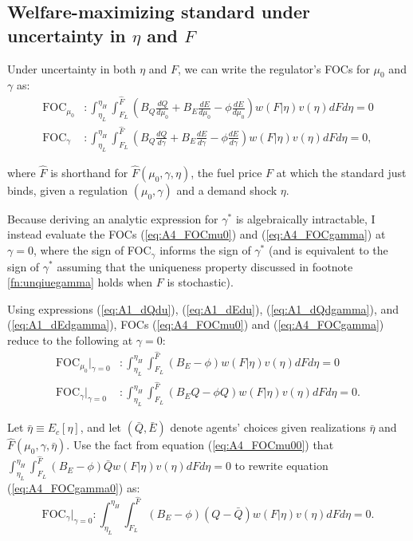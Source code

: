 \documentclass[12pt]{article}
\begin{document}
\subsection{Welfare-maximizing standard under uncertainty in $\eta$ and $F$} \label{appx:doubleuncert}

Under uncertainty in both $\eta$ and $F$, we can write the regulator's FOCs for $\mu_0$ and $\gamma$ as:
\begin{align}
\text{FOC}_{\mu_0}&:\int_{\eta_L}^{\eta_H}\int_{F_L}^{\hat{F}}\left(B_Q\frac{dQ}{d\mu_0} +B_E\frac{dE}{d\mu_0} -\phi\frac{dE}{d\mu_0}\right)w(F|\eta)v(\eta)dFd\eta = 0 \label{eq:A4_FOCmu0} \\
\text{FOC}_{\gamma}&:\int_{\eta_L}^{\eta_H}\int_{F_L}^{\hat{F}}\left(B_Q\frac{dQ}{d\gamma} +B_E\frac{dE}{d\gamma} -\phi\frac{dE}{d\gamma}\right)w(F|\eta)v(\eta)dFd\eta = 0, \label{eq:A4_FOCgamma}
\end{align}

where $\hat{F}$ is shorthand for $\hat{F}(\mu_0,\gamma,\eta)$, the fuel price $F$ at which the standard just binds, given a regulation $(\mu_0,\gamma)$ and a demand shock $\eta$. 

Because deriving an analytic expression for $\gamma^*$ is algebraically intractable, I instead evaluate the FOCs (\ref{eq:A4_FOCmu0}) and (\ref{eq:A4_FOCgamma}) at $\gamma=0$, where the sign of FOC$_\gamma$ informs the sign of $\gamma^*$ (and is equivalent to the sign of $\gamma^*$ assuming that the uniqueness property discussed in footnote \ref{fn:unqiuegamma} holds when $F$ is stochastic).

Using expressions (\ref{eq:A1_dQdu}), (\ref{eq:A1_dEdu}), (\ref{eq:A1_dQdgamma}), and (\ref{eq:A1_dEdgamma}), FOCs (\ref{eq:A4_FOCmu0}) and (\ref{eq:A4_FOCgamma}) reduce to the following at $\gamma=0$:
\begin{align}
\text{FOC}_{\mu_0}|_{\gamma=0}&:\int_{\eta_L}^{\eta_H}\int_{F_L}^{\hat{F}}(B_E-\phi)w(F|\eta)v(\eta)dFd\eta = 0 \label{eq:A4_FOCmu00} \\
\text{FOC}_{\gamma}|_{\gamma=0}&:\int_{\eta_L}^{\eta_H}\int_{F_L}^{\hat{F}}(B_EQ-\phi Q)w(F|\eta)v(\eta)dFd\eta = 0. \label{eq:A4_FOCgamma0}
\end{align}

Let $\bar{\eta}\equiv E_c[\eta]$, and let $(\bar{Q},\bar{E})$ denote agents' choices given realizations $\bar{\eta}$ and $\hat{F}(\mu_0,\gamma,\bar{\eta})$. Use the fact from equation (\ref{eq:A4_FOCmu00}) that $\int_{\eta_L}^{\eta_H}\int_{F_L}^{\hat{F}}(B_E-\phi)\bar{Q}w(F|\eta)v(\eta)dFd\eta = 0$ to rewrite equation (\ref{eq:A4_FOCgamma0}) as:
\begin{equation}
\text{FOC}_{\gamma}|_{\gamma=0}:\int_{\eta_L}^{\eta_H}\int_{F_L}^{\hat{F}}(B_E-\phi)(Q-\bar{Q})w(F|\eta)v(\eta)dFd\eta = 0. \label{eq:A4_FOCgamma0_2}
\end{equation}
\end{document}
